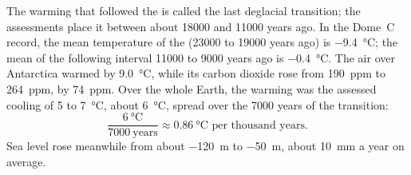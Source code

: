 \begin{example}
The warming that followed the  is called the last
deglacial transition; the assessments place it between about \num{18000} and
\num{11000} years ago. In the Dome~C record, the mean temperature of the
 (\num{23000} to \num{19000} years ago) is
\qty{-9.4}{\degreeCelsius}; the mean of the following interval \num{11000} to
\num{9000} years ago is \qty{-0.4}{\degreeCelsius}. The air over Antarctica
warmed by \qty{9.0}{\degreeCelsius}, while its carbon dioxide rose from
\qty{190}{ppm} to \qty{264}{ppm}, by \qty{74}{ppm}. Over the whole Earth,
the warming was the assessed cooling of 5 to \qty{7}{\degreeCelsius}, about
\qty{6}{\degreeCelsius}, spread over the \num{7000} years of the transition:
\[
  \frac{\qty{6}{\degreeCelsius}}{\num{7000}\ \text{years}} \approx
  \qty{0.86}{\degreeCelsius} \text{ per thousand years.}
\]
Sea level rose meanwhile from about \qty{-120}{m} to \qty{-50}{m}, about
\qty{10}{mm} a year on average.
\end{example}

